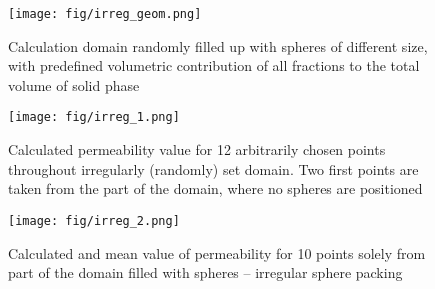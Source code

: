 \documentclass[10pt, conference]{IEEEtran}
\begin{document}
\begin{figure}[ht]
\centering
\texttt{[image: fig/irreg\_geom.png]}
\caption{Calculation domain randomly filled up with spheres of different size, with predefined volumetric contribution of all fractions to the total volume of solid phase}
\label{fig:irreg_geom}
\vspace{0.5cm}
\texttt{[image: fig/irreg\_1.png]}
\caption{Calculated permeability value for 12 arbitrarily chosen points throughout irregularly (randomly) set domain. Two first points are taken from the part of the domain, where no spheres are
positioned}
\label{fig:irreg_1}
\vspace{0.75cm}
\texttt{[image: fig/irreg\_2.png]}
\caption{Calculated and mean value of permeability for 10 points solely from part of the domain filled with spheres -- irregular sphere packing}
\label{fig:irreg_2}
\end{figure}
\end{document}
